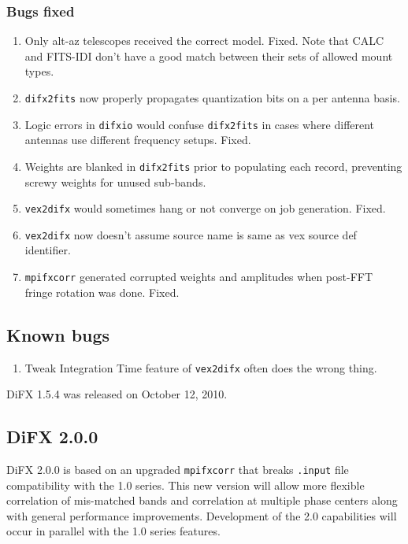 \subsubsection{Bugs fixed}

\begin{enumerate}
\item Only alt-az telescopes received the correct model.  Fixed.  Note that CALC and FITS-IDI don't have a good match between their sets of allowed mount types.
\item {\tt difx2fits} now properly propagates quantization bits on a per antenna basis.
\item Logic errors in {\tt difxio} would confuse {\tt difx2fits} in cases where different antennas use different frequency setups.  Fixed.
\item Weights are blanked in {\tt difx2fits} prior to populating each record, preventing screwy weights for unused sub-bands.
\item {\tt vex2difx} would sometimes hang or not converge on job generation.  Fixed.
\item {\tt vex2difx} now doesn't assume source name is same as vex source def identifier.
\item {\tt mpifxcorr} generated corrupted weights and amplitudes when post-FFT fringe rotation was done.  Fixed.
\end{enumerate}

\subsection{Known bugs}

\begin{enumerate}
\item Tweak Integration Time feature of {\tt vex2difx} often does the wrong thing.
\end{enumerate}

DiFX 1.5.4 was released on October 12, 2010.

\subsection{DiFX 2.0.0}

DiFX 2.0.0 is based on an upgraded {\tt mpifxcorr} that breaks {\tt .input} file compatibility with the 1.0 series.
This new version will allow more flexible correlation of mis-matched bands and correlation at multiple phase centers along with general performance improvements.
Development of the 2.0 capabilities will occur in parallel with the 1.0 series features.

